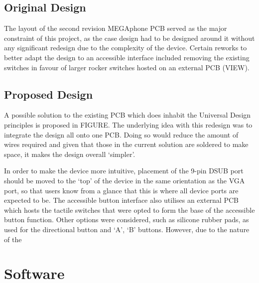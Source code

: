 \subsection{Original Design}

The layout of the second revision MEGAphone PCB served as the major constraint of this project, as the case design had to be designed around it without any significant redesign due to the complexity of the device. Certain reworks to better adapt the design to an accessible interface included removing the existing switches in favour of larger rocker switches hosted on an external PCB (VIEW).

\subsection{Proposed Design}

A possible solution to the existing PCB which does inhabit the Universal Design principles is proposed in FIGURE. 
The underlying idea with this redesign was to integrate the design all onto one PCB. Doing so would reduce the amount of wires required and given that those in the current solution are soldered to make space, it makes the design overall ‘simpler’.

In order to make the device more intuitive, placement of the 9-pin DSUB port should be moved to the ‘top’ of the device in the same orientation as the VGA port, so that users know from a glance that this is where all device ports are expected to be.
The accessible button interface also utilises an external PCB which hosts the tactile switches that were opted to form the base of the accessible button function. 
Other options were considered, such as silicone rubber pads, as used for the directional button and ‘A’, ‘B’ buttons. However, due to the nature of the



\section{Software}


